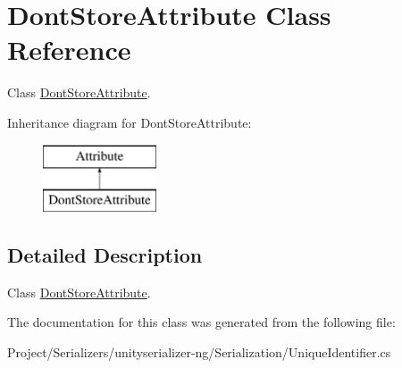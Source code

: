 \hypertarget{class_dont_store_attribute}{}\section{Dont\+Store\+Attribute Class Reference}
\label{class_dont_store_attribute}


Class \hyperlink{class_dont_store_attribute}{Dont\+Store\+Attribute}.  


Inheritance diagram for Dont\+Store\+Attribute\+:\begin{figure}[H]
\begin{center}
\leavevmode
\includegraphics[height=2.000000cm]{class_dont_store_attribute}
\end{center}
\end{figure}


\subsection{Detailed Description}
Class \hyperlink{class_dont_store_attribute}{Dont\+Store\+Attribute}. 



The documentation for this class was generated from the following file\+:\begin{DoxyCompactItemize}
\item 
Project/\+Serializers/unityserializer-\/ng/\+Serialization/Unique\+Identifier.\+cs\end{DoxyCompactItemize}
